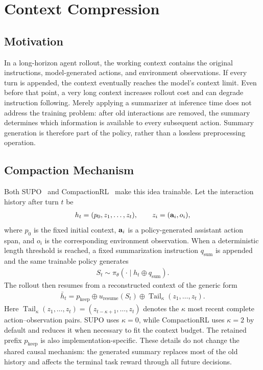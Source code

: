 \section{Context Compression}
\label{sec:context.compression}

\subsection{Motivation}

In a long-horizon agent rollout, the working context contains the original
instructions, model-generated actions, and environment observations.  If every
turn is appended, the context eventually reaches the model's context limit.
Even before that point, a very long context increases rollout cost and can
degrade instruction following.  Merely applying a summarizer at inference time
does not address the training problem: after old interactions are removed, the
summary determines which information is available to every subsequent action.
Summary generation is therefore part of the policy, rather than a lossless
preprocessing operation.

\subsection{Compaction Mechanism}

Both SUPO~\citep{lu2025scaling} and
CompactionRL~\citep{li2026compactionrl} make this idea trainable.  Let the
interaction history after turn $t$ be
\begin{align}
    h_t=(p_0,z_1,\ldots,z_t),
    \qquad z_i=(\mathbf{a}_i,o_i),
    \label{eq:compaction.history}
\end{align}
where $p_0$ is the fixed initial context, $\mathbf{a}_i$ is a policy-generated
assistant action span, and $o_i$ is the corresponding environment observation.
When a deterministic length threshold is reached, a fixed summarization
instruction $q_{\mathrm{sum}}$ is appended and the same trainable policy
generates
\begin{align}
    S_t\sim\pi_\theta(\cdot\mid h_t\oplus q_{\mathrm{sum}}).
    \label{eq:compaction.summary}
\end{align}
The rollout then resumes from a reconstructed context of the generic form
\begin{align}
    \bar h_t
    =
    p_{\mathrm{keep}}
    \oplus u_{\mathrm{resume}}(S_t)
    \oplus \operatorname{Tail}_\kappa(z_1,\ldots,z_t).
    \label{eq:compaction.reconstruction}
\end{align}
Here $\operatorname{Tail}_\kappa(z_1,\ldots,z_t)
=(z_{t-\kappa+1},\ldots,z_t)$ denotes the $\kappa$ most recent complete
action--observation pairs.  SUPO uses $\kappa=0$, while CompactionRL uses
$\kappa=2$ by default and reduces it when necessary to fit the context budget.  The retained
prefix $p_{\mathrm{keep}}$ is also implementation-specific.  These details do
not change the shared causal mechanism: the generated summary replaces most of
the old history and affects the terminal task reward through all future
decisions.

